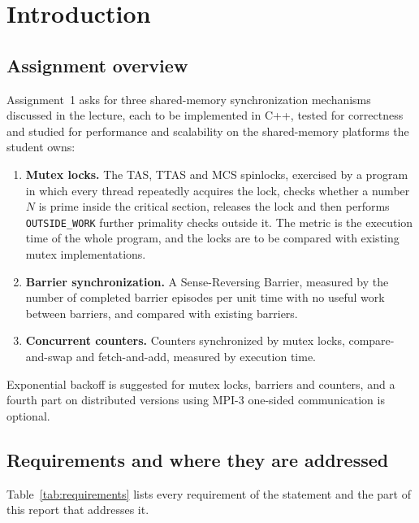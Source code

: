 \newpage
\section{Introduction}\label{sec:intro}

\subsection{Assignment overview}

Assignment~1\cite{r1} asks for three shared-memory synchronization mechanisms discussed in the lecture, each to be implemented in C++, tested for correctness and studied for performance and scalability on the shared-memory platforms the student owns:

\begin{enumerate}[leftmargin=1.5em]
  \item \textbf{Mutex locks.} The TAS, TTAS and MCS spinlocks, exercised by a program in which every thread repeatedly acquires the lock, checks whether a number $N$ is prime inside the critical section, releases the lock and then performs \texttt{OUTSIDE\_WORK} further primality checks outside it. The metric is the execution time of the whole program, and the locks are to be compared with existing mutex implementations.
  \item \textbf{Barrier synchronization.} A Sense-Reversing Barrier, measured by the number of completed barrier episodes per unit time with no useful work between barriers, and compared with existing barriers.
  \item \textbf{Concurrent counters.} Counters synchronized by mutex locks, compare-and-swap and fetch-and-add, measured by execution time.
\end{enumerate}

Exponential backoff is suggested for mutex locks, barriers and counters, and a fourth part on distributed versions using MPI-3 one-sided communication is optional.

\subsection{Requirements and where they are addressed}

Table~\ref{tab:requirements} lists every requirement of the statement and the part of this report that addresses it.

